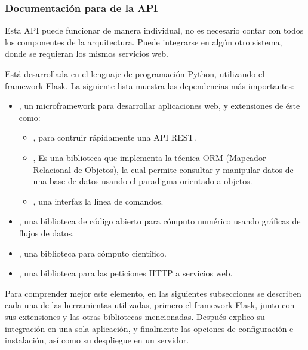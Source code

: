 \subsubsection{Documentación para  de la API}
\label{\detokenize{chapter_two/desc_cloudnao:documentacion-para-maintainers-de-la-api}}
Esta API puede funcionar de manera individual, no es necesario contar con todos
los componentes de la arquitectura. Puede integrarse en algún otro sistema,
donde se requieran los mismos servicios web. 

Está desarrollada en el lenguaje de programación Python, utilizando el framework
Flask. La siguiente lista muestra las dependencias más importantes:
\begin{itemize}
\item {} 
, un microframework para desarrollar aplicaciones web, y extensiones de éste como:
\begin{itemize}
\item {} 
, para contruir rápidamente una API REST.

\item {} 
, Es una biblioteca que implementa la técnica ORM (Mapeador Relacional de Objetos), la cual permite consultar y manipular datos de una base de datos usando el paradigma orientado a objetos.

\item {} 
, una interfaz la línea de comandos.

\end{itemize}

\item {} 
,  una biblioteca de código abierto para cómputo numérico usando gráficas de flujos de datos.

\item {} 
, una biblioteca para cómputo científico.

\item {} 
, una biblioteca para las peticiones HTTP a servicios web.

\end{itemize}

Para comprender mejor este elemento, en las siguientes subsecciones se describen
cada una de las herramientas utilizadas, primero el framework Flask, junto con
sus extensiones y las otras bibliotecas mencionadas. Después explico su
integración en una sola aplicación, y finalmente las opciones de
configuración e instalación, así como su despliegue en un servidor.


